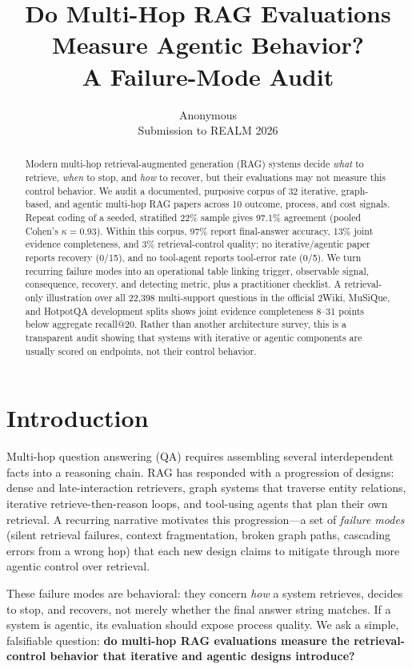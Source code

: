 \documentclass[11pt]{article}
\title{Do Multi-Hop RAG Evaluations Measure Agentic Behavior?\\A Failure-Mode Audit}
\author{Anonymous \\ Submission to REALM 2026}
\begin{document}
\maketitle

\begin{abstract}
Modern multi-hop retrieval-augmented generation (RAG) systems decide \emph{what} to retrieve,
\emph{when} to stop, and \emph{how} to recover, but their evaluations may not measure this control
behavior. We audit a documented, purposive corpus of 32 iterative, graph-based, and agentic multi-hop
RAG papers across 10 outcome, process, and cost signals. Repeat coding of a seeded, stratified 22\%
sample gives 97.1\% agreement (pooled Cohen's $\kappa=0.93$). Within this corpus, 97\% report
final-answer accuracy, 13\% joint evidence completeness, and 3\% retrieval-control quality; no
iterative/agentic paper reports recovery (0/15), and no tool-agent reports tool-error rate (0/5).
We turn recurring failure modes into an operational table linking trigger,
observable signal, consequence, recovery, and detecting metric, plus a practitioner checklist. A
retrieval-only illustration over all 22,398 multi-support questions in the official 2Wiki, MuSiQue,
and HotpotQA development splits shows joint evidence completeness 8--31 points below aggregate
recall@20. Rather than another architecture survey, this is a transparent audit showing that
systems with iterative or agentic components are usually scored on endpoints, not their control behavior.
\end{abstract}

\section{Introduction}
Multi-hop question answering (QA) requires assembling several interdependent facts into a reasoning
chain. RAG has responded with a progression of designs: dense and late-interaction retrievers, graph
systems that traverse entity relations, iterative retrieve-then-reason loops, and tool-using agents
that plan their own retrieval. A recurring narrative motivates this progression---a set of
\emph{failure modes} (silent retrieval failures, context fragmentation, broken graph paths, cascading
errors from a wrong hop) that each new design claims to mitigate through more agentic control over
retrieval.

These failure modes are behavioral: they concern \emph{how} a system retrieves, decides to stop, and
recovers, not merely whether the final answer string matches. If a system is agentic, its evaluation
should expose process quality. We ask a simple, falsifiable question: \textbf{do multi-hop RAG
evaluations measure the retrieval-control behavior that iterative and agentic designs introduce?}
\end{document}
